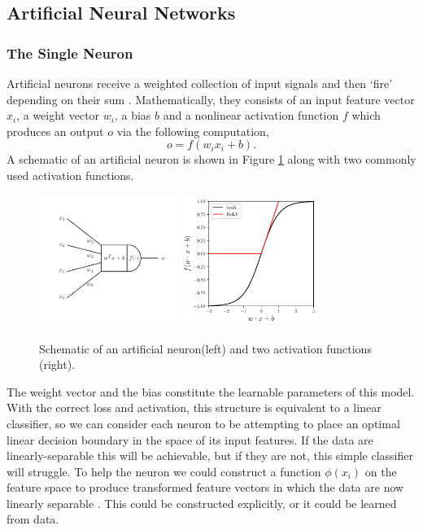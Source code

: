 \subsection{Artificial Neural Networks}

\subsubsection{The Single Neuron}
Artificial neurons receive a weighted collection of input signals and then `fire' depending on their sum \cite{CS231n}. Mathematically, they consists of an input feature vector $x_{i}$, a weight vector $w_{i}$, a bias $b$ and a nonlinear activation function $f$ which produces an output $o$ via the following computation,
\begin{equation}
    o = f(w_{i}x_{i} + b).
\end{equation}
A schematic of an artificial neuron is shown in Figure \ref{fig:machine_learning:neuron_and_activation} along with two commonly used activation functions. 
\begin{figure}[h!]
    \begin{center}
        \includegraphics[width=0.4\textwidth]{figures/machine_learning/neuron.pdf}
        \includegraphics[width=0.4\textwidth]{figures/machine_learning/activation_functions.pdf}
    \end{center}
    \caption{Schematic of an artificial neuron(left) and two activation functions (right).}
        \label{fig:machine_learning:neuron_and_activation}
\end{figure}
The weight vector and the bias constitute the learnable parameters of this model. 
With the correct loss and activation, this structure is equivalent to a linear classifier, so we can consider each neuron to be attempting to place an optimal linear decision boundary in the space of its input features. 
If the data are linearly-separable this will be achievable, but if they are not, this simple classifier will struggle. 
To help the neuron we could construct a function $\phi(x_{i})$ on the feature space to produce transformed feature vectors in which the data are now linearly separable \cite{DeepLearningBook}. 
This could be constructed explicitly, or it could be learned from data. 



